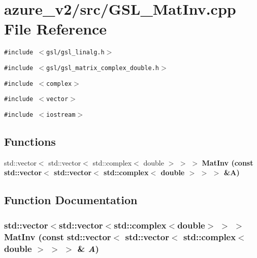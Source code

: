 \section{azure\_\-v2/src/GSL\_\-Mat\-Inv.cpp File Reference}
\label{GSL__MatInv_8cpp}
{\tt \#include $<$gsl/gsl\_\-linalg.h$>$}\par
{\tt \#include $<$gsl/gsl\_\-matrix\_\-complex\_\-double.h$>$}\par
{\tt \#include $<$complex$>$}\par
{\tt \#include $<$vector$>$}\par
{\tt \#include $<$iostream$>$}\par
\subsection*{Functions}
\begin{CompactItemize}
\item 
std::vector$<$ std::vector$<$ std::complex$<$ double $>$ $>$ $>$ \bf{Mat\-Inv} (const std::vector$<$ std::vector$<$ std::complex$<$ double $>$ $>$ $>$ \&A)
\end{CompactItemize}


\subsection{Function Documentation}
\subsubsection{\setlength{\rightskip}{0pt plus 5cm}std::vector$<$std::vector$<$std::complex$<$double$>$ $>$ $>$ Mat\-Inv (const std::vector$<$ std::vector$<$ std::complex$<$ double $>$ $>$ $>$ \& {\em A})}\label{GSL__MatInv_8cpp_c4fd54de37a76a8ed03216975df17607}


